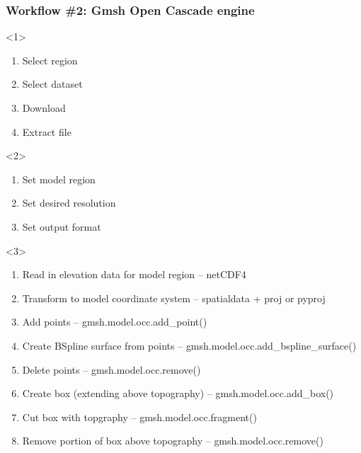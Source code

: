 \documentclass[aspectratio=169]{beamer}
\begin{document}
\begin{frame}
  \frametitle{Workflow \#2: Gmsh Open Cascade engine}

  \begin{enumerate}
    \begin{onlyenv}<1>
      \begin{enumerate}
      \item Select region
      \item Select dataset
      \item Download
      \item Extract file
      \end{enumerate}
    \end{onlyenv}
    \begin{onlyenv}<2>
      \begin{enumerate}
      \item Set model region
      \item Set desired resolution
      \item Set output format
      \end{enumerate}
    \end{onlyenv}
    \begin{onlyenv}<3>
      \begin{enumerate}
      \item Read in elevation data for model region -- {\ttfamily netCDF4}
      \item Transform to model coordinate system -- {\ttfamily spatialdata + proj} or {\ttfamily pyproj}
      \item Add points -- {\ttfamily gmsh.model.occ.add\_point()}
      \item Create BSpline surface from points -- {\ttfamily gmsh.model.occ.add\_bspline\_surface()}
      \item Delete points -- {\ttfamily gmsh.model.occ.remove()}
      \item Create box (extending above topography) -- {\ttfamily gmsh.model.occ.add\_box()}
      \item Cut box with topgraphy -- {\ttfamily gmsh.model.occ.fragment()}
      \item Remove portion of box above topography -- {\ttfamily gmsh.model.occ.remove()}
      \end{enumerate}
    \end{onlyenv}
  \end{enumerate}

\end{frame}




\end{document}
